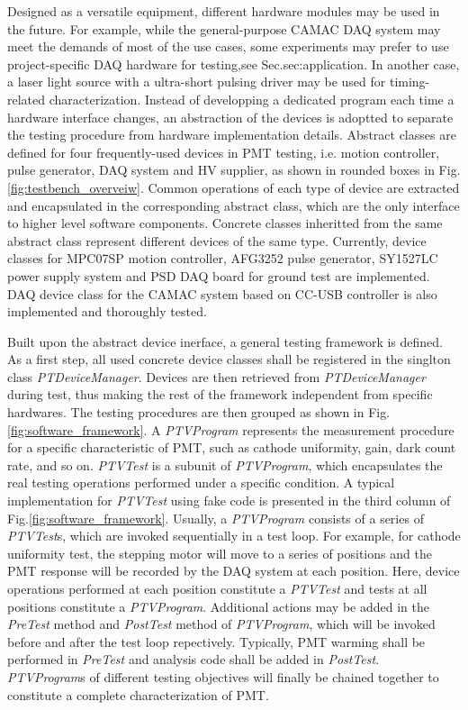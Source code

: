 \documentclass[5p, times]{elsarticle}
\begin{document}
Designed as a versatile equipment, different hardware modules may be used in the future.
For example, while the general-purpose CAMAC DAQ system may meet the demands of most of the use cases, some experiments may prefer to use project-specific DAQ hardware for testing,see Sec.{sec:application}.
In another case, a laser light source with a ultra-short pulsing driver may be used for timing-related characterization.
Instead of developping a dedicated program each time a hardware interface changes, an abstraction of the devices is adoptted to separate the testing procedure from hardware implementation details. 
Abstract classes are defined for four frequently-used devices in PMT testing, i.e. motion controller, pulse generator, DAQ system and HV supplier, as shown in rounded boxes in Fig.\ref{fig:testbench_overveiw}.
Common operations of each type of device are extracted and encapsulated in the corresponding abstract class, which are the only interface to higher level software components.
Concrete classes inheritted from the same abstract class represent different devices of the same type.
Currently, device classes for MPC07SP motion controller, AFG3252 pulse generator, SY1527LC power supply system and PSD DAQ board for ground test are implemented.
DAQ device class for the CAMAC system based on CC-USB controller is also implemented and thoroughly tested.

Built upon the abstract device inerface, a general testing framework is defined.
As a first step, all used concrete device classes shall be registered in the singlton class \textit{PTDeviceManager}.
Devices are then retrieved from \textit{PTDeviceManager} during test, thus making the rest of the framework independent from specific hardwares.
The testing procedures are then grouped as shown in Fig.\ref{fig:software_framework}.
A \textit{PTVProgram} represents the measurement procedure for a specific characteristic of PMT, such as cathode uniformity, gain, dark count rate, and so on.
\textit{PTVTest} is a subunit of \textit{PTVProgram}, which encapsulates the real testing operations performed under a specific condition.
A typical implementation for \textit{PTVTest} using fake code is presented in the third column of Fig.\ref{fig:software_framework}.
Usually, a \textit{PTVProgram} consists of a series of \textit{PTVTest}s, which are invoked sequentially in a test loop.
For example, for cathode uniformity test, the stepping motor will move to a series of positions and the PMT response will be recorded by the DAQ system at each position.
Here, device operations performed at each position constitute a \textit{PTVTest} and tests at all positions constitute a \textit{PTVProgram}.
Additional actions may be added in the \textit{PreTest} method and \textit{PostTest} method of \textit{PTVProgram}, which will be invoked before and after the test loop repectively.
Typically, PMT warming shall be performed in \textit{PreTest} and analysis code shall be added in \textit{PostTest}.
\textit{PTVProgram}s of different testing objectives will finally be chained together to constitute a complete characterization of PMT.
\end{document}
